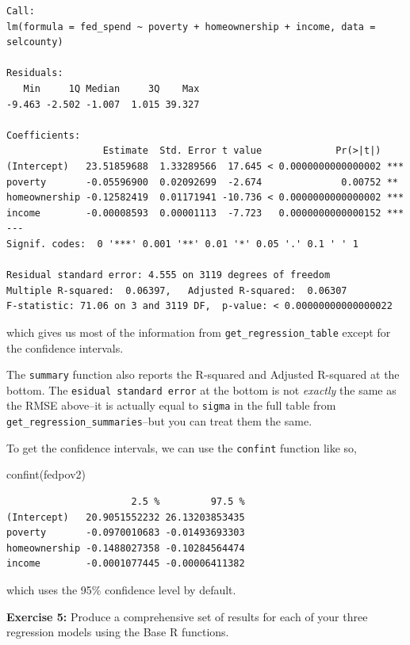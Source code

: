 \documentclass[
]{book}
\makeatletter
\newenvironment{Shaded}{\begin{snugshade}}{\end{snugshade}}
\newcommand{\FunctionTok}[1]{\textcolor[rgb]{0,0,0}{#1}}
\newcommand{\NormalTok}[1]{#1}
\newenvironment{kframe}{%
\medskip{}
\setlength{\fboxsep}{.8em}
 \def\at@end@of@kframe{}%
 \ifinner\ifhmode%
  \def\at@end@of@kframe{\end{minipage}}%
  \begin{minipage}{\columnwidth}%
 \fi\fi%
 \def\FrameCommand##1{\hskip\@totalleftmargin \hskip-\fboxsep
 \colorbox{shadecolor}{##1}\hskip-\fboxsep
     \hskip-\linewidth \hskip-\@totalleftmargin \hskip\columnwidth}%
 \MakeFramed {\advance\hsize-\width
   \@totalleftmargin\z@ \linewidth\hsize
   \@setminipage}}%
 {\par\unskip\endMakeFramed%
 \at@end@of@kframe}
\renewenvironment{Shaded}{\begin{kframe}}{\end{kframe}}
\newenvironment{rmdblock}[1]
  {\begin{shaded*}
  }
  {\end{shaded*}
  }
\newenvironment{learncheck}
  {\begin{rmdblock}{warning}}
  {\end{rmdblock}}
\makeatother
\begin{document}
\begin{verbatim}
Call:
lm(formula = fed_spend ~ poverty + homeownership + income, data = selcounty)

Residuals:
   Min     1Q Median     3Q    Max 
-9.463 -2.502 -1.007  1.015 39.327 

Coefficients:
                 Estimate  Std. Error t value             Pr(>|t|)    
(Intercept)   23.51859688  1.33289566  17.645 < 0.0000000000000002 ***
poverty       -0.05596900  0.02092699  -2.674              0.00752 ** 
homeownership -0.12582419  0.01171941 -10.736 < 0.0000000000000002 ***
income        -0.00008593  0.00001113  -7.723   0.0000000000000152 ***
---
Signif. codes:  0 '***' 0.001 '**' 0.01 '*' 0.05 '.' 0.1 ' ' 1

Residual standard error: 4.555 on 3119 degrees of freedom
Multiple R-squared:  0.06397,	Adjusted R-squared:  0.06307 
F-statistic: 71.06 on 3 and 3119 DF,  p-value: < 0.00000000000000022
\end{verbatim}

which gives us most of the information from \texttt{get\_regression\_table} except for the confidence intervals.

The \texttt{summary} function also reports the R-squared and Adjusted R-squared at the bottom. The \texttt{esidual\ standard\ error} at the bottom is not \emph{exactly} the same as the RMSE above--it is actually equal to \texttt{sigma} in the full table from \texttt{get\_regression\_summaries}--but you can treat them the same.

To get the confidence intervals, we can use the \texttt{confint} function like so,

\begin{Shaded}
\begin{Highlighting}[]
\FunctionTok{confint}\NormalTok{(fedpov2)}
\end{Highlighting}
\end{Shaded}

\begin{verbatim}
                      2.5 %         97.5 %
(Intercept)   20.9051552232 26.13203853435
poverty       -0.0970010683 -0.01493693303
homeownership -0.1488027358 -0.10284564474
income        -0.0001077445 -0.00006411382
\end{verbatim}

which uses the 95\% confidence level by default.

\begin{learncheck}
\textbf{Exercise 5:} Produce a comprehensive set of results for each of
your three regression models using the Base R functions.
\end{learncheck}
\end{document}

